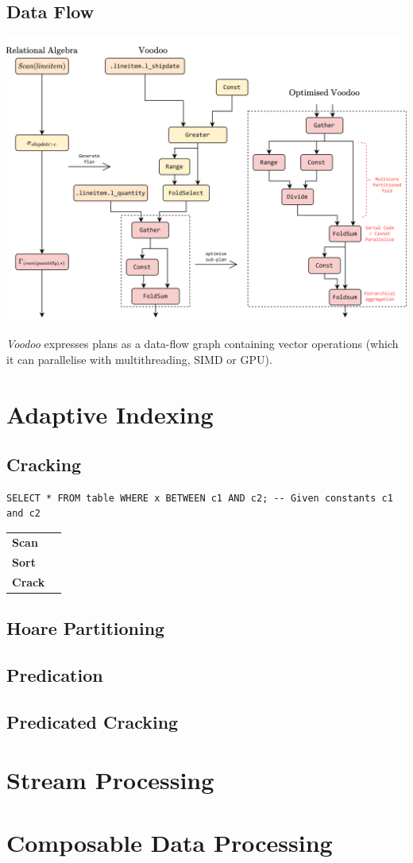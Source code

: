 \subsection{Data Flow}
\begin{center}
    \includegraphics[width=\textwidth]{advanced_topics/images/voodoo.drawio.png}
\end{center}
\textit{Voodoo} expresses plans as a data-flow graph containing vector operations (which it can parallelise with multithreading, SIMD or GPU).

\section{Adaptive Indexing}
\subsection{Cracking}
\begin{verbatim}
SELECT * FROM table WHERE x BETWEEN c1 AND c2; -- Given constants c1 and c2
\end{verbatim}
\begin{center}
    \begin{tabular}{l p{}}
        \textbf{Scan}  & \\
        \textbf{Sort}  & \\
        \textbf{Crack} & \\
    \end{tabular}
\end{center}



\subsection{Hoare Partitioning}

\subsection{Predication}
\subsection{Predicated Cracking}
\section{Stream Processing}
\section{Composable Data Processing}


